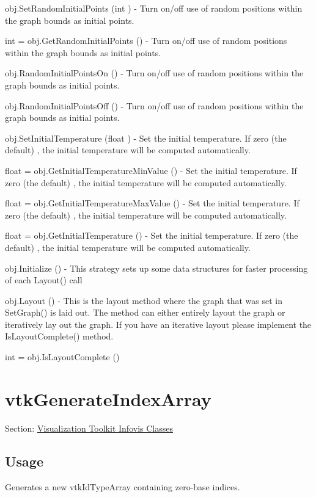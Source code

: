 \begin{DoxyItemize}
\item {\ttfamily obj.\-Set\-Random\-Initial\-Points (int )} -\/ Turn on/off use of random positions within the graph bounds as initial points.  
\item {\ttfamily int = obj.\-Get\-Random\-Initial\-Points ()} -\/ Turn on/off use of random positions within the graph bounds as initial points.  
\item {\ttfamily obj.\-Random\-Initial\-Points\-On ()} -\/ Turn on/off use of random positions within the graph bounds as initial points.  
\item {\ttfamily obj.\-Random\-Initial\-Points\-Off ()} -\/ Turn on/off use of random positions within the graph bounds as initial points.  
\item {\ttfamily obj.\-Set\-Initial\-Temperature (float )} -\/ Set the initial temperature. If zero (the default) , the initial temperature will be computed automatically.  
\item {\ttfamily float = obj.\-Get\-Initial\-Temperature\-Min\-Value ()} -\/ Set the initial temperature. If zero (the default) , the initial temperature will be computed automatically.  
\item {\ttfamily float = obj.\-Get\-Initial\-Temperature\-Max\-Value ()} -\/ Set the initial temperature. If zero (the default) , the initial temperature will be computed automatically.  
\item {\ttfamily float = obj.\-Get\-Initial\-Temperature ()} -\/ Set the initial temperature. If zero (the default) , the initial temperature will be computed automatically.  
\item {\ttfamily obj.\-Initialize ()} -\/ This strategy sets up some data structures for faster processing of each Layout() call  
\item {\ttfamily obj.\-Layout ()} -\/ This is the layout method where the graph that was set in Set\-Graph() is laid out. The method can either entirely layout the graph or iteratively lay out the graph. If you have an iterative layout please implement the Is\-Layout\-Complete() method.  
\item {\ttfamily int = obj.\-Is\-Layout\-Complete ()}  
\end{DoxyItemize}\hypertarget{vtkinfovis_vtkgenerateindexarray}{}\section{vtk\-Generate\-Index\-Array}\label{vtkinfovis_vtkgenerateindexarray}
Section\-: \hyperlink{sec_vtkinfovis}{Visualization Toolkit Infovis Classes} \hypertarget{vtkwidgets_vtkxyplotwidget_Usage}{}\subsection{Usage}\label{vtkwidgets_vtkxyplotwidget_Usage}
Generates a new vtk\-Id\-Type\-Array containing zero-\/base indices.

